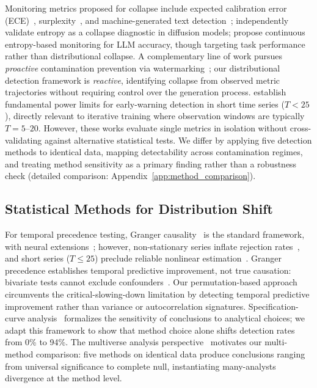 Monitoring metrics proposed for collapse include expected calibration error (ECE)~\citep{du2025scales}, surplexity~\citep{gambetta2024surplexity}, and machine-generated text detection~\citep{drayson2025detection}; \citet{shi2025closer} independently validate entropy as a collapse diagnostic in diffusion models; \citet{buffa2026entropy} propose continuous entropy-based monitoring for LLM accuracy, though targeting task performance rather than distributional collapse.
A complementary line of work pursues \emph{proactive} contamination prevention via watermarking~\citep{kirchenbauer2023watermark}; our distributional detection framework is \emph{reactive}, identifying collapse from observed metric trajectories without requiring control over the generation process.
\citet{boettiger2012limits} establish fundamental power limits for early-warning detection in short time series ($T{<}25$), directly relevant to iterative training where observation windows are typically $T{=}5$--$20$.
However, these works evaluate single metrics in isolation without cross-validating against alternative statistical tests.
We differ by applying five detection methods to identical data, mapping detectability across contamination regimes, and treating method sensitivity as a primary finding rather than a robustness check (detailed comparison: Appendix~\ref{app:method_comparison}).

\subsection{Statistical Methods for Distribution Shift}
\label{sec:rw_methods}

For temporal precedence testing, Granger causality~\citep{granger1969investigating} is the standard framework, with neural extensions~\citep{tank2021neural,runge2019detecting}; however, non-stationary series inflate rejection rates~\citep{granger1974spurious}, and short series ($T{\leq}25$) preclude reliable nonlinear estimation~\citep{boettiger2012limits}.
Granger precedence establishes temporal predictive improvement, not true causation: bivariate tests cannot exclude confounders~\citep{shojaie2022granger}.
Our permutation-based approach circumvents the critical-slowing-down limitation by detecting temporal predictive improvement rather than variance or autocorrelation signatures.
Specification-curve analysis~\citep{simonsohn2020specification} formalizes the sensitivity of conclusions to analytical choices; we adapt this framework to show that method choice alone shifts detection rates from 0\% to 94\%.
The multiverse analysis perspective~\citep{steegen2016increasing,silberzahn2018many,coretta2023multidimensional,kapoor2024reforms} motivates our multi-method comparison: five methods on identical data produce conclusions ranging from universal significance to complete null, instantiating many-analysts divergence at the method level.
